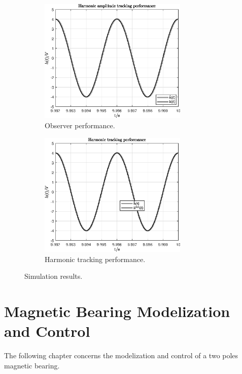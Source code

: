 \documentclass[11pt,a4paper,oneside]{book}
\numberwithin{equation}{section}
\theoremstyle{it}
\theoremstyle{definition}
\begin{document}
\begin{figure}[H]
	\centering
	\begin{subfigure}{.5\textwidth}
		\centering
		\includegraphics[width = 200pt, angle=0, 
		keepaspectratio]{figures/shaker/vector/observer_performance.eps}
		\captionsetup{width=.5\textwidth}
		\caption{Observer performance.}
		\label{}
	\end{subfigure}%
	\begin{subfigure}{.5\textwidth}
		\centering
		\includegraphics[width = 200pt, angle=0, 
		keepaspectratio]{figures/shaker/vector/harmonic_tracking.eps}
		\captionsetup{width=.5\textwidth}
		\caption{Harmonic tracking performance.}
		\label{}
	\end{subfigure}
	\caption{Simulation results.}
	\label{}
\end{figure}


\section{Magnetic Bearing Modelization and Control}	
The following chapter concerns the modelization and control of a two poles magnetic bearing.
\end{document}
